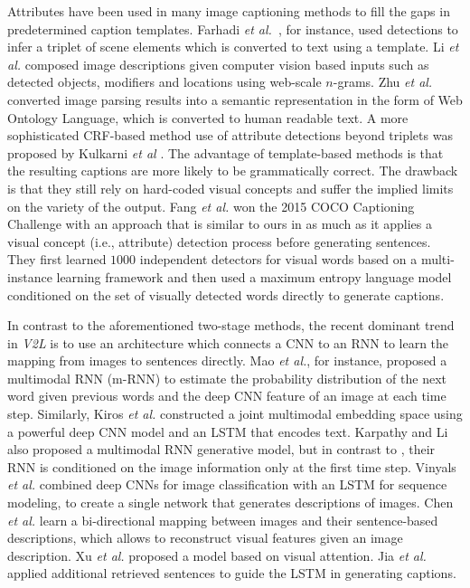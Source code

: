 \documentclass[10pt,journal,compsoc]{IEEEtran}
\newcommand{\etal}{\emph{et al.}}
\def\V2L{\textit{V2L}}
\begin{document}
Attributes have been used in many image captioning methods to fill the gaps in predetermined caption templates. Farhadi \etal~\cite{farhadi2010every}, for instance, used detections to infer a triplet of scene elements which is converted to text using a template. Li \etal \cite{li2011composing} composed image descriptions given computer vision based inputs such as detected objects, modifiers and locations using web-scale $n$-grams. Zhu \etal \cite{yao2010i2t} converted image parsing results into a semantic representation in the form of Web Ontology Language, which is converted to human readable text. A more sophisticated CRF-based method use of attribute detections beyond triplets was proposed by Kulkarni \textit{et al} \cite{kulkarni2013babytalk}. The advantage of template-based methods is that the resulting captions are more likely to be grammatically correct. The drawback is that they still rely on hard-coded visual concepts and suffer the implied limits on the variety of the output. Fang \etal \cite{fang2014captions} won the 2015 COCO Captioning Challenge with an approach that is similar to ours in as much as it applies a visual concept (i.e., attribute) detection process before generating sentences. They first learned $1000$ independent detectors for visual words based on a multi-instance learning framework and then used a maximum entropy language model conditioned on the set of visually detected words directly to generate captions. 


In contrast to the aforementioned two-stage methods, the recent dominant trend in \V2L is to use an architecture which connects a CNN to an RNN to learn the mapping from images to sentences directly. Mao \etal \cite{mao2014deep}, for instance, proposed a multimodal RNN (m-RNN) to estimate the probability distribution of the next word given previous words and the deep CNN feature of an image at each time step. Similarly, Kiros \etal \cite{kiros2014unifying} constructed a joint multimodal embedding space using a powerful deep CNN model and an LSTM that encodes text. Karpathy and Li \cite{Karpathy2014deepvs} also proposed a multimodal RNN generative model, but in contrast to \cite{mao2014deep}, their RNN is conditioned on the image information only at the first time step. Vinyals \etal \cite{vinyals2014show} combined deep CNNs for image classification with an LSTM for sequence modeling, to create a single network that generates descriptions of images. Chen \etal \cite{Chen2015CVPRMind} learn a bi-directional mapping between images and their sentence-based descriptions, which allows to reconstruct visual features given an image description. Xu \etal \cite{xu2015show} proposed a model based on visual attention. Jia \etal \cite{jia2015guilding} applied additional retrieved sentences to guide the LSTM in generating captions.
\end{document}
